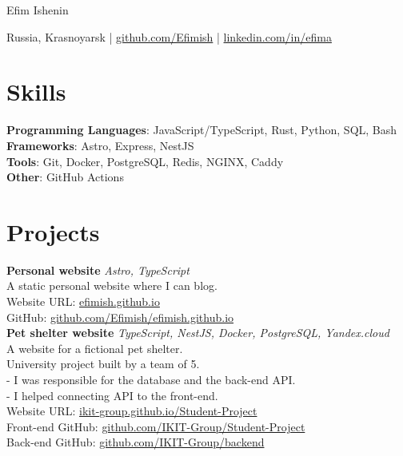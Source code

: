 \documentclass[a4paper, 12pt]{article}
\begin{document}
\centerline{\Huge Efim Ishenin}
\vspace{10pt}
\centerline{
  Russia, Krasnoyarsk |
  \href{https://github.com/Efimish}{github.com/Efimish} |
  \href{https://www.linkedin.com/in/efima}{linkedin.com/in/efima}
}

\section{Skills}

\textbf{Programming Languages}: JavaScript/TypeScript, Rust, Python, SQL, Bash \\
\textbf{Frameworks}: Astro, Express, NestJS \\
\textbf{Tools}: Git, Docker, PostgreSQL, Redis, NGINX, Caddy \\
\textbf{Other}: GitHub Actions

\section{Projects}

\textbf{Personal website} \hfill \textit{Astro, TypeScript} \\
A static personal website where I can blog. \\
Website URL: \href{https://efimish.github.io/}{efimish.github.io} \\
GitHub: \href{https://github.com/Efimish/efimish.github.io}{github.com/Efimish/efimish.github.io} \\

\textbf{Pet shelter website} \hfill \textit{TypeScript, NestJS, Docker, PostgreSQL, Yandex.cloud} \\
A website for a fictional pet shelter. \\
University project built by a team of 5. \\
- I was responsible for the database and the back-end API. \\
- I helped connecting API to the front-end. \\
Website URL: \href{https://ikit-group.github.io/Student-Project/}{ikit-group.github.io/Student-Project} \\
Front-end GitHub: \href{https://github.com/IKIT-Group/Student-Project}{github.com/IKIT-Group/Student-Project} \\
Back-end GitHub: \href{https://github.com/IKIT-Group/backend}{github.com/IKIT-Group/backend} \\
\end{document}
